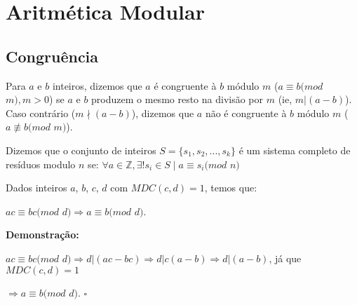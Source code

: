 
\chapter{Aritmética Modular} %

\label{Chapter3} %


\section{Congruência}

\begin{definition}
Para $a$ e $b$ inteiros, dizemos que $a$ é congruente à $b$ módulo $m$ ($a \equiv b (mod$ $m), m > 0$) 
se $a$ e $b$ produzem o mesmo resto na divisão por $m$ (ie, $m|(a-b)$).
Caso contrário ($m\nmid (a-b)$), dizemos que $a$ não é congruente à $b$ módulo $m$ ($a \not\equiv b (mod $ $m)$).
\\
\end{definition}


\begin{definition}
Dizemos que o conjunto de inteiros $S = \{s_1, s_2, ..., s_k\}$ é um sistema completo de resíduos modulo $n$ se:
$\forall a \in \mathbb{Z}, \exists! s_i \in S \mid a \equiv s_i (mod$ $n)$
\end{definition}


\begin{proposition}\label{corolario_implicacao_mdc}
Dados inteiros $a$, $b$, $c$, $d$ com $MDC(c,d)=1$, temos que: 

$ac \equiv bc (mod$ $d) \Rightarrow a \equiv b (mod$ $d)$.
\end{proposition}
\textbf{Demonstração:}

$ac \equiv bc (mod$ $d) \Rightarrow d|(ac-bc) \Rightarrow d|c(a-b) \Rightarrow d|(a-b)$, já que $MDC(c,d)=1$

$\Rightarrow a \equiv b (mod$ $d)$. $\square$
\\



